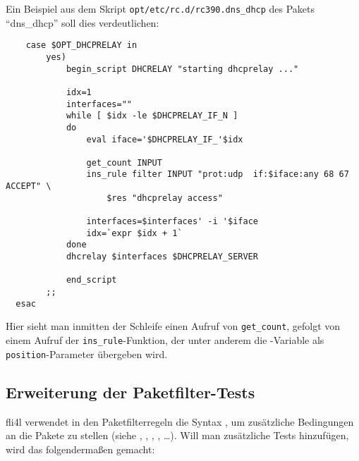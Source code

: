 Ein Beispiel aus dem Skript \texttt{opt/etc/rc.d/rc390.dns\_dhcp} des Pakets
"`dns\_dhcp"' soll dies verdeutlichen:

\begin{example}
\begin{verbatim}
    case $OPT_DHCPRELAY in
        yes)
            begin_script DHCRELAY "starting dhcprelay ..."

            idx=1
            interfaces=""
            while [ $idx -le $DHCPRELAY_IF_N ]
            do
                eval iface='$DHCPRELAY_IF_'$idx

                get_count INPUT
                ins_rule filter INPUT "prot:udp  if:$iface:any 68 67 ACCEPT" \
                    $res "dhcprelay access"

                interfaces=$interfaces' -i '$iface
                idx=`expr $idx + 1`
            done
            dhcrelay $interfaces $DHCPRELAY_SERVER

            end_script
        ;;
  esac
\end{verbatim}
\end{example}

Hier sieht man inmitten der Schleife einen Aufruf von \texttt{get\_count},
gefolgt von einem Aufruf der \texttt{ins\_rule}-Funktion, der unter anderem
die \var{res}-Variable als \texttt{position}-Parameter übergeben wird.


\subsection{Erweiterung der Paketfilter-Tests}

fli4l verwendet in den Paketfilterregeln die Syntax ,
um zusätzliche Bedingungen an die Pakete zu stellen
(siehe , , , ,
\ldots). Will man zusätzliche
Tests hinzufügen, wird das folgendermaßen gemacht:

